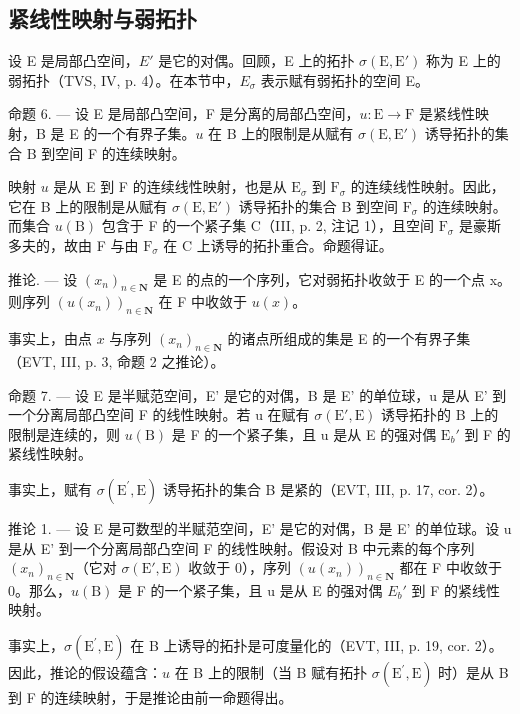 \subsection{紧线性映射与弱拓扑}

设 E 是局部凸空间，\(E'\) 是它的对偶。回顾，E 上的拓扑 \(\sigma(\mathrm{E},\mathrm{E}')\) 称为 E 上的弱拓扑（TVS, IV, p. 4）。在本节中，\(E_{\sigma}\) 表示赋有弱拓扑的空间 E。

命题 6. --- 设 E 是局部凸空间，F 是分离的局部凸空间，\(u: \mathrm{E} \to \mathrm{F}\) 是紧线性映射，B 是 E 的一个有界子集。\(u\) 在 B 上的限制是从赋有 \(\sigma(\mathrm{E}, \mathrm{E}')\) 诱导拓扑的集合 B 到空间 F 的连续映射。

映射 \(u\) 是从 E 到 F 的连续线性映射，也是从 \(\mathrm{E}_{\sigma}\) 到 \(\mathrm{F}_{\sigma}\) 的连续线性映射。因此，它在 B 上的限制是从赋有 \(\sigma(\mathrm{E}, \mathrm{E}')\) 诱导拓扑的集合 B 到空间 \(\mathrm{F}_{\sigma}\) 的连续映射。而集合 \(u(\mathrm{B})\) 包含于 F 的一个紧子集 C（III, p. 2, 注记 1），且空间 \(\mathrm{F}_{\sigma}\) 是豪斯多夫的，故由 F 与由 \(\mathrm{F}_{\sigma}\) 在 C 上诱导的拓扑重合。命题得证。

推论. --- 设 \((x_{n})_{n\in\mathbf{N}}\) 是 E 的点的一个序列，它对弱拓扑收敛于 E 的一个点 x。则序列 \((u(x_{n}))_{n\in\mathbf{N}}\) 在 F 中收敛于 \(u(x)\)。

事实上，由点 \(x\) 与序列 \((x_{n})_{n\in \mathbf{N}}\) 的诸点所组成的集是 E 的一个有界子集（EVT, III, p. 3, 命题 2 之推论）。

命题 7. --- 设 E 是半赋范空间，E' 是它的对偶，B 是 E' 的单位球，u 是从 E' 到一个分离局部凸空间 F 的线性映射。若 u 在赋有 \(\sigma(\mathrm{E}',\mathrm{E})\) 诱导拓扑的 B 上的限制是连续的，则 \(u(\mathrm{B})\) 是 F 的一个紧子集，且 u 是从 E 的强对偶 \(\mathrm{E}_b'\) 到 F 的紧线性映射。

事实上，赋有 \(\sigma(\mathrm{E}^{\prime},\mathrm{E})\) 诱导拓扑的集合 B 是紧的（EVT, III, p. 17, cor. 2）。

推论 1. --- 设 E 是可数型的半赋范空间，E' 是它的对偶，B 是 E' 的单位球。设 u 是从 E' 到一个分离局部凸空间 F 的线性映射。假设对 B 中元素的每个序列 \((x_{n})_{n\in\mathbf{N}}\)（它对 \(\sigma(\mathrm{E}',\mathrm{E})\) 收敛于 0），序列 \((u(x_{n}))_{n\in\mathbf{N}}\) 都在 F 中收敛于 0。那么，\(u(\mathrm{B})\) 是 F 的一个紧子集，且 u 是从 E 的强对偶 \(E_{b}'\) 到 F 的紧线性映射。

事实上，\(\sigma(\mathrm{E}^{\prime},\mathrm{E})\) 在 B 上诱导的拓扑是可度量化的（EVT, III, p. 19, cor. 2）。因此，推论的假设蕴含：\(u\) 在 B 上的限制（当 B 赋有拓扑 \(\sigma(\mathrm{E}^{\prime},\mathrm{E})\) 时）是从 B 到 F 的连续映射，于是推论由前一命题得出。

